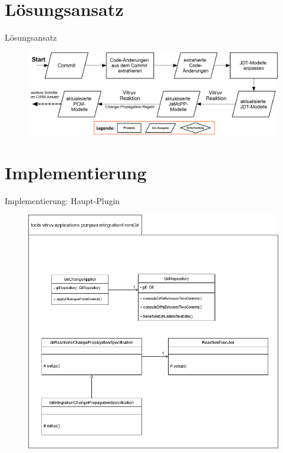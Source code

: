 \documentclass[18pt]{beamer}
\begin{document}
\section{Lösungsansatz}
\begin{frame}{Lösungsansatz}
\begin{figure}
\includegraphics[scale=0.3]{pictures/Vorgehensweise.png}
\end{figure}
\end{frame}


\section{Implementierung}
\begin{frame}{Implementierung: Haupt-Plugin}
\begin{figure}
\includegraphics[scale=0.28]{pictures/integrationFromGit_diagram.png}
\end{figure}
\end{frame}
\end{document}
